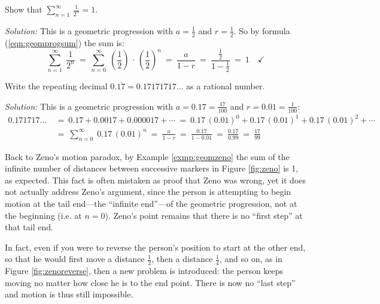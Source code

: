 \newpage
\begin{exmp}\label{exmp:geomzeno}
\noindent Show that
$\displaystyle\sum_{n=1}^{\infty} \,\frac{1}{2^n} = 1$.\vspace{1mm}
\par\noindent\emph{Solution:} This is a geometric progression with
$a=\frac{1}{2}$ and $r=\frac{1}{2}$. So by formula (\ref{eqn:geomprogsum}) the
sum is:
\[
\sum_{n=1}^{\infty} \;\frac{1}{2^n} ~=~
\sum_{n=0}^{\infty} \;\left(\frac{1}{2}\right) \,\cdot\, \left(\frac{1}{2}\right)^n ~=~ \frac{a}{1-r} ~=~
\frac{\frac{1}{2}}{1 - \frac{1}{2}} ~=~ 1 \quad\checkmark
\]
\end{exmp}
\begin{exmp}
\noindent Write the repeating decimal $0.\overline{17} = 0.17171717\ldots$ as a
rational number.\vspace{1mm}
\par\noindent\emph{Solution:} This is a geometric progression with
$a=0.17=\frac{17}{100}$ and $r=0.01=\frac{1}{100}$:
\begin{align*}
0.171717\ldots ~&=~ 0.17 + 0.0017 + 0.000017 + \cdots
~=~ 0.17\,(0.01)^0 + 0.17\,(0.01)^1 + 0.17\,(0.01)^2 + \cdots\\
&=~ \sum_{n=0}^{\infty} \;0.17\,(0.01)^n  ~=~ \frac{a}{1-r} ~=~
\frac{0.17}{1 - 0.01} ~=~ \frac{0.17}{0.99} ~=~ \frac{17}{99}
\end{align*}
\end{exmp}
\divider
\vspace{2mm}

Back to Zeno's motion paradox, by Example \ref{exmp:geomzeno} the sum of the
infinite number of distances between successive markers in Figure \ref{fig:zeno}
is 1, as expected. This fact is often mistaken as proof that Zeno was wrong, yet
it does not actually address Zeno's argument, since the person is attempting to
begin motion at the tail end---the ``infinite end''---of the geometric
progression, not at the beginning (i.e. at $n=0$). Zeno's point remains that
there is no ``first step'' at that tail end.

In fact, even if you were to reverse the person's position to start at the other
end, so that he would first move a distance $\frac{1}{2}$, then a distance
$\frac{1}{4}$, and so on, as in Figure \ref{fig:zenoreverse}, then a new problem
is introduced: the person keeps moving no matter how close he is to the end
point. There is now no ``last step'' and motion is thus still impossible.

